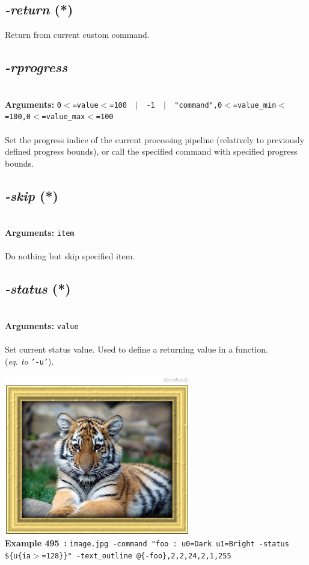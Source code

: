 \documentclass[a4paper,11pt,twoside]{book}
\begin{document}
\subsection{\emph{-return} (*)}\vspace*{-0.5em}
Return from current custom command.


\subsection{\emph{-rprogress} }\vspace*{-0.5em}
~\\\textbf{Arguments: } 
{\small \texttt{0$<$=value$<$=100 ~$|$~ -1 ~$|$~ "command",0$<$=value\_min$<$=100,0$<$=value\_max$<$=100}}\\~\\
Set the progress indice of the current processing pipeline (relatively to
previously defined progress bounds), or call the specified command with
specified progress bounds.


\subsection{\emph{-skip} (*)}\vspace*{-0.5em}
~\\\textbf{Arguments: } 
{\small \texttt{item}}\\~\\
Do nothing but skip specified item.


\subsection{\emph{-status} (*)}\vspace*{-0.5em}
~\\\textbf{Arguments: } 
{\small \texttt{value}}\\~\\
Set current status value. Used to define a returning value in a function.
~\\(\emph{eq. to} {\small \texttt{'-u'}}).
\begin{center}\includegraphics[keepaspectratio=true,height=7cm,width=\textwidth]{img/gmic_def495.jpg}\\
{\footnotesize \textbf{Example 495~:} \texttt{image.jpg -command "foo : u0=Dark u1=Bright -status \$\{u\{ia$>$=128\}\}" -text\_outline @\{-foo\},2,2,24,2,1,255}}
\end{center}
\end{document}
